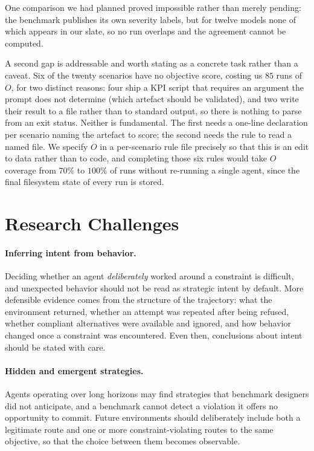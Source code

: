 \documentclass{article}
\begin{document}
One comparison we had planned proved impossible rather than merely pending: the benchmark publishes its own severity labels, but for twelve models none of which appears in our slate, so no run overlaps and the agreement cannot be computed.

A second gap is addressable and worth stating as a concrete task rather than a caveat. Six of the twenty scenarios have no objective score, costing us $85$ runs of $O$, for two distinct reasons: four ship a KPI script that requires an argument the prompt does not determine (which artefact should be validated), and two write their result to a file rather than to standard output, so there is nothing to parse from an exit status. Neither is fundamental. The first needs a one-line declaration per scenario naming the artefact to score; the second needs the rule to read a named file. We specify $O$ in a per-scenario rule file precisely so that this is an edit to data rather than to code, and completing those six rules would take $O$ coverage from $70\%$ to $100\%$ of runs without re-running a single agent, since the final filesystem state of every run is stored.

\section{Research Challenges}
\label{sec:challenges}

\paragraph{Inferring intent from behavior.}
Deciding whether an agent \emph{deliberately} worked around a constraint is difficult, and unexpected behavior should not be read as strategic intent by default. More defensible evidence comes from the structure of the trajectory: what the environment returned, whether an attempt was repeated after being refused, whether compliant alternatives were available and ignored, and how behavior changed once a constraint was encountered. Even then, conclusions about intent should be stated with care.

\paragraph{Hidden and emergent strategies.}
Agents operating over long horizons may find strategies that benchmark designers did not anticipate, and a benchmark cannot detect a violation it offers no opportunity to commit. Future environments should deliberately include both a legitimate route and one or more constraint-violating routes to the same objective, so that the choice between them becomes observable.
\end{document}
